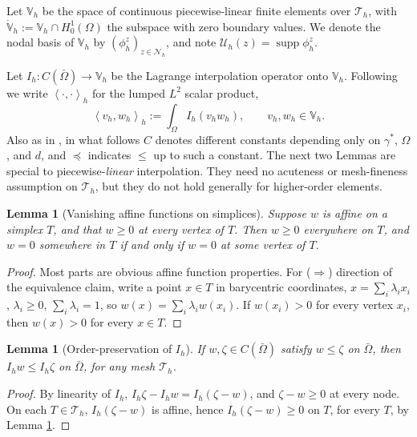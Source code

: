 \documentclass[12pt]{amsart}
\numberwithin{equation}{section}
\theoremstyle{plain}
\newtheorem{lemma}[theorem]{Lemma}
\theoremstyle{definition}
\theoremstyle{remark}
\newcommand{\Om}{\Omega}
\newcommand{\Th}{\mathcal{T}_h}
\newcommand{\Vh}{\mathbb{V}_h}
\newcommand{\Vhr}{\mathring{\mathbb{V}}_h}
\newcommand{\Nh}{\mathcal{N}_h}
\newcommand{\Ih}{I_h}
\newcommand{\Uh}{\mathcal{U}_h}
\begin{document}
Let $\Vh$ be the space of continuous piecewise-linear finite elements over $\Th$, with
$\Vhr := \Vh \cap H_0^1(\Om)$ the subspace with zero boundary values.  We denote the nodal basis of $\Vh$ by $(\phi_h^z)_{z \in \Nh}$, and note $\Uh(z)=\operatorname{supp} \phi_h^z$.

Let $\Ih:C(\bar\Om) \to \Vh$ be the Lagrange interpolation operator onto $\Vh$.  Following \cite{NSV03} we write $\left< \cdot,\cdot\right>_h$ for the lumped $L^2$ scalar product,
\begin{equation}
\label{eq:lumped}
\left< v_h, w_h\right>_h := \int_\Om \Ih(v_h w_h), \qquad v_h, w_h \in \Vh.
\end{equation}
Also as in \cite{NSV03}, in what follows $C$ denotes different constants depending only on $\gamma^*$, $\Om$, and $d$, and $\preceq$ indicates $\le$ up to such a constant.  The next two Lemmas are special to piecewise-\emph{linear} interpolation.  They need no acuteness or mesh-fineness assumption on $\Th$, but they do not hold generally for higher-order elements.

\begin{lemma}[Vanishing affine functions on simplices]
\label{lem:affine}
Suppose $w$ is affine on a simplex $T$, and that $w \ge 0$ at every vertex of $T$.  Then $w\ge 0$ everywhere on $T$, and $w = 0$ somewhere in $T$ if and only if $w = 0$ at some vertex of $T$.
\end{lemma}

\begin{proof}
Most parts are obvious affine function properties.  For ($\Rightarrow$) direction of the equivalence claim, write a point $x \in T$ in barycentric coordinates, $x = \sum_i \lambda_i x_i$, $\lambda_i \ge 0$, $\sum_i \lambda_i = 1$, so $w(x) = \sum_i \lambda_i w(x_i)$.  If $w(x_i) > 0$ for every vertex $x_i$, then $w(x) > 0$ for every $x \in T$.
\end{proof}

\begin{lemma}[Order-preservation of $I_h$]
\label{lem:monotone}
If $w, \zeta \in C(\bar\Om)$ satisfy $w \le \zeta$ on $\bar\Om$, then
$\Ih w \le \Ih \zeta$ on $\bar\Om$, for any mesh $\Th$.
\end{lemma}

\begin{proof}
By linearity of $\Ih$, $\Ih \zeta - \Ih w = \Ih(\zeta - w)$, and $\zeta - w \ge 0$ at every node. On each $T \in \Th$, $\Ih(\zeta-w)$ is affine, hence $\Ih(\zeta-w) \ge 0$ on $T$, for every $T$, by Lemma \ref{lem:affine}.
\end{proof}
\end{document}
